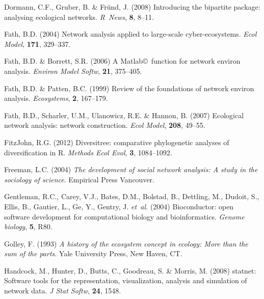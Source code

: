 \documentclass[11pt]{article}
\newcommand{\R}{R}
\begin{document}
\begin{thebibliography}{79}
Dormann, C.F., Gruber, B. \& Fr{\"u}nd, J. (2008) Introducing the bipartite
  package: analysing ecological networks.
\newblock \emph{\R\ News}, \textbf{8}, 8--11.

Fath, B.D. (2004) Network analysis applied to large-scale cyber-ecosystems.
\newblock \emph{Ecol Model}, \textbf{171}, 329--337.

Fath, B.D. \& Borrett, S.R. (2006) A {Matlab}\copyright\ function for network
  environ analysis.
\newblock \emph{Environ Model Softw}, \textbf{21}, 375--405.

Fath, B.D. \& Patten, B.C. (1999) Review of the foundations of network environ
  analysis.
\newblock \emph{Ecosystems}, \textbf{2}, 167--179.

Fath, B.D., Scharler, U.M., Ulanowicz, R.E. \& Hannon, B. (2007) Ecological
  network analysis: network construction.
\newblock \emph{Ecol Model}, \textbf{208}, 49--55.

FitzJohn, R.G. (2012) Diversitree: comparative phylogenetic analyses of
  diversification in {R}.
\newblock \emph{Methods Ecol Evol}, \textbf{3}, 1084--1092.

Freeman, L.C. (2004) \emph{The development of social network analysis: A study
  in the sociology of science}.
\newblock Empirical Press Vancouver.

Gentleman, R.C., Carey, V.J., Bates, D.M., Bolstad, B., Dettling, M., Dudoit,
  S., Ellis, B., Gautier, L., Ge, Y., Gentry, J. \emph{et~al.} (2004)
  Bioconductor: open software development for computational biology and
  bioinformatics.
\newblock \emph{Genome biology}, \textbf{5}, R80.

Golley, F. (1993) \emph{A history of the ecosystem concept in ecology: More
  than the sum of the parts}.
\newblock Yale University Press, New Haven, CT.

Handcock, M., Hunter, D., Butts, C., Goodreau, S. \& Morris, M. (2008) statnet:
  Software tools for the representation, visualization, analysis and simulation
  of network data.
\newblock \emph{J Stat Softw}, \textbf{24}, 1548.


\end{thebibliography}
\end{document}
